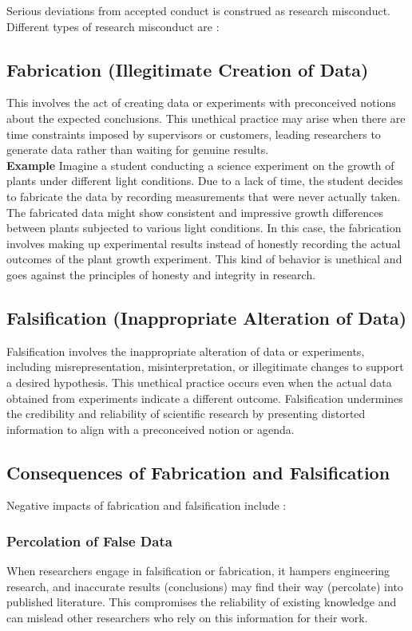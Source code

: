 \documentclass{article}
\begin{document}
	\noindent Serious deviations from accepted conduct is construed as research misconduct. \\
	Different types of research misconduct are :

	\subsection{Fabrication (Illegitimate Creation of Data)}
	This involves the act of creating data or experiments with preconceived notions about the expected
	conclusions.
	This unethical practice may arise when there are time constraints imposed by supervisors or customers,
	leading researchers to generate data rather than waiting for genuine results. \\

	\textbf{Example}
	Imagine a student conducting a science experiment on the growth of plants under different light conditions.
	Due to a lack of time, the student decides to fabricate the data by recording measurements that were never
	actually taken.
	The fabricated data might show consistent and impressive growth differences between plants subjected to
	various light conditions.
	In this case, the fabrication involves making up experimental results instead of honestly recording the
	actual outcomes of the plant growth experiment.
	This kind of behavior is unethical and goes against the principles of honesty and integrity in research.

	\subsection{Falsification (Inappropriate Alteration of Data)}
	Falsification involves the inappropriate alteration of data or experiments, including misrepresentation,
	misinterpretation, or illegitimate changes to support a desired hypothesis.
	This unethical practice occurs even when the actual data obtained from experiments indicate a different
	outcome.
	Falsification undermines the credibility and reliability of scientific research by presenting distorted
	information to align with a preconceived notion or agenda.

	\subsection{Consequences of Fabrication and Falsification}
	Negative impacts of fabrication and falsification include :

	\subsubsection{Percolation of False Data}
	When researchers engage in falsification or fabrication, it hampers engineering research, and inaccurate
	results (conclusions) may find their way (percolate) into published literature.
	This compromises the reliability of existing knowledge and can mislead other researchers who rely on this
	information for their work.
\end{document}

